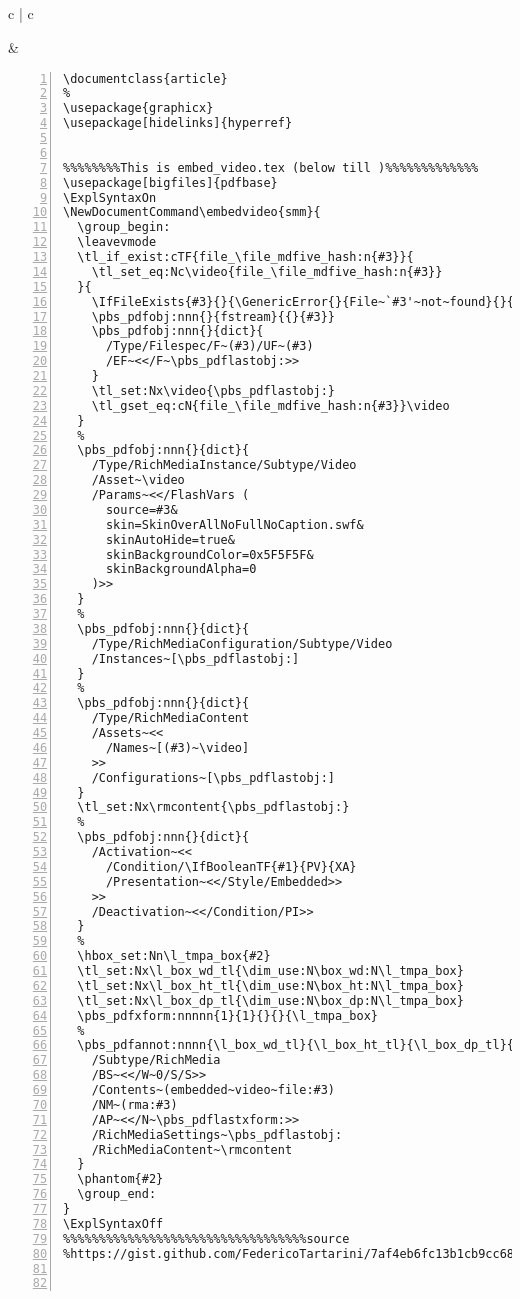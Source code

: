 \subsection{}
\begin{table}[h!]
\begin{tabular}{c | c}
\begin{minipage}[m]{0.4\textwidth}

\end{minipage}
&
\begin{minipage}[m]{0.55\textwidth}
\renewcommand\textminus{\mbox{-}}%

\begin{lstlisting}[numberstyle=\zebra{orange!15}{red!15},numbers=left,basicstyle=\ttfamily\tiny]
\documentclass{article}
%
\usepackage{graphicx}
\usepackage[hidelinks]{hyperref}


%%%%%%%%This is embed_video.tex (below till )%%%%%%%%%%%%% 
\usepackage[bigfiles]{pdfbase}
\ExplSyntaxOn
\NewDocumentCommand\embedvideo{smm}{
  \group_begin:
  \leavevmode
  \tl_if_exist:cTF{file_\file_mdfive_hash:n{#3}}{
    \tl_set_eq:Nc\video{file_\file_mdfive_hash:n{#3}}
  }{
    \IfFileExists{#3}{}{\GenericError{}{File~`#3'~not~found}{}{}}
    \pbs_pdfobj:nnn{}{fstream}{{}{#3}}
    \pbs_pdfobj:nnn{}{dict}{
      /Type/Filespec/F~(#3)/UF~(#3)
      /EF~<</F~\pbs_pdflastobj:>>
    }
    \tl_set:Nx\video{\pbs_pdflastobj:}
    \tl_gset_eq:cN{file_\file_mdfive_hash:n{#3}}\video
  }
  %
  \pbs_pdfobj:nnn{}{dict}{
    /Type/RichMediaInstance/Subtype/Video
    /Asset~\video
    /Params~<</FlashVars (
      source=#3&
      skin=SkinOverAllNoFullNoCaption.swf&
      skinAutoHide=true&
      skinBackgroundColor=0x5F5F5F&
      skinBackgroundAlpha=0
    )>>
  }
  %
  \pbs_pdfobj:nnn{}{dict}{
    /Type/RichMediaConfiguration/Subtype/Video
    /Instances~[\pbs_pdflastobj:]
  }
  %
  \pbs_pdfobj:nnn{}{dict}{
    /Type/RichMediaContent
    /Assets~<<
      /Names~[(#3)~\video]
    >>
    /Configurations~[\pbs_pdflastobj:]
  }
  \tl_set:Nx\rmcontent{\pbs_pdflastobj:}
  %
  \pbs_pdfobj:nnn{}{dict}{
    /Activation~<<
      /Condition/\IfBooleanTF{#1}{PV}{XA}
      /Presentation~<</Style/Embedded>>
    >>
    /Deactivation~<</Condition/PI>>
  }
  %
  \hbox_set:Nn\l_tmpa_box{#2}
  \tl_set:Nx\l_box_wd_tl{\dim_use:N\box_wd:N\l_tmpa_box}
  \tl_set:Nx\l_box_ht_tl{\dim_use:N\box_ht:N\l_tmpa_box}
  \tl_set:Nx\l_box_dp_tl{\dim_use:N\box_dp:N\l_tmpa_box}
  \pbs_pdfxform:nnnnn{1}{1}{}{}{\l_tmpa_box}
  %
  \pbs_pdfannot:nnnn{\l_box_wd_tl}{\l_box_ht_tl}{\l_box_dp_tl}{
    /Subtype/RichMedia
    /BS~<</W~0/S/S>>
    /Contents~(embedded~video~file:#3)
    /NM~(rma:#3)
    /AP~<</N~\pbs_pdflastxform:>>
    /RichMediaSettings~\pbs_pdflastobj:
    /RichMediaContent~\rmcontent
  }
  \phantom{#2}
  \group_end:
}
\ExplSyntaxOff
%%%%%%%%%%%%%%%%%%%%%%%%%%%%%%%%%%source
%https://gist.github.com/FedericoTartarini/7af4eb6fc13b1cb9cc68b7e8ea823d50



\end{lstlisting}
\end{minipage}
\end{tabular}
\end{table}
